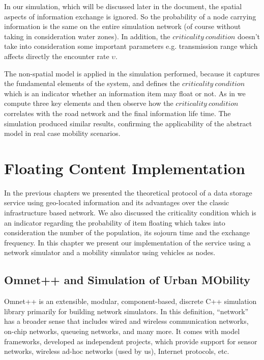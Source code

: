 In our simulation, which will be discussed later in the document, the spatial
aspects of information exchange is ignored. So the probability of a node
carrying information is the same on the entire simulation network (of course
without taking in consideration water zones). In addition, the $criticality\ 
condition$ doesn't take into consideration some important parameters e.g. 
transmission range which affects directly the encounter rate $\upsilon$.

The non-spatial model is applied in the simulation performed, because it
captures the fundamental elements of the system, and defines the $criticality\ 
condition$ which is an indicator whether an information item may float or not.
As in \cite{percomfloatingcontent} we compute three key elements and then observe
how the $criticality\ condition$ correlates with the road network and the final
information life time. The simulation produced similar results, confirming the
applicability of the abstract model in real case mobility scenarios.





\chapter{Floating Content Implementation} \label{chap3}

In the previous chapters we presented the theoretical protocol of a data storage
service using geo-located information and its advantages over the classic
infrastructure based network. We also discussed the criticality condition which
is an indicator regarding the probability of item floating which takes into
consideration the number of the population, its sojourn time and the exchange
frequency. In this chapter we present our implementation of the service using a
network simulator and a mobility simulator using vehicles as nodes.

\section{Omnet++ and Simulation of Urban MObility}

Omnet++ is an extensible, modular, component-based, discrete C++ simulation
library primarily for building network simulators. In this definition, ``network''
has a broader sense that includes wired and wireless communication networks,
on-chip networks, queueing networks, and many more. It comes with model
frameworks, developed as independent projects, which provide support for sensor
networks, wireless ad-hoc networks (used by us), Internet protocols, etc.


